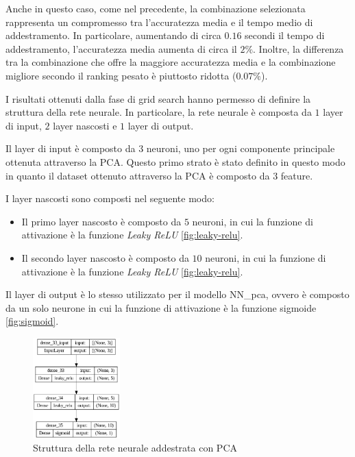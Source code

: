 Anche in questo caso, come nel precedente, la combinazione selezionata 
rappresenta un compromesso tra l'accuratezza media e il tempo medio di 
addestramento. In particolare, aumentando di circa $0.16$ secondi il tempo di 
addestramento, l'accuratezza media aumenta di circa il $2\%$. Inoltre, la 
differenza tra la combinazione che offre la maggiore accuratezza media e la 
combinazione migliore secondo il ranking pesato è piuttosto ridotta ($0.07\%$).

I risultati ottenuti dalla fase di grid search hanno permesso di definire la
struttura della rete neurale. In particolare, la rete neurale è composta da $1$
layer di input, $2$ layer nascosti e $1$ layer di output.

Il layer di input è composto da $3$ neuroni, uno per ogni componente principale
ottenuta attraverso la PCA. Questo primo strato è stato definito in questo modo
in quanto il dataset ottenuto attraverso la PCA è composto da $3$ feature.

I layer nascosti sono composti nel seguente modo:
\begin{itemize}
    \item Il primo layer nascosto è composto da $5$ neuroni, in cui la funzione di
          attivazione è la funzione \textit{Leaky ReLU} \ref{fig:leaky-relu}.
    \item Il secondo layer nascosto è composto da $10$ neuroni, in cui la funzione
          di attivazione è la funzione \textit{Leaky ReLU} \ref{fig:leaky-relu}.
\end{itemize}

Il layer di output è lo stesso utilizzato per il modello NN\_pca, ovvero è composto
da un solo neurone in cui la funzione di attivazione è la funzione sigmoide \ref{fig:sigmoid}.

\begin{figure}[!ht]
    \centering
    \includegraphics[width=0.3\textwidth]{img/rete/struttura_rete_pca.png}
    \caption{Struttura della rete neurale addestrata con PCA}
    \label{fig:strutturaReteNeuralePCA}
\end{figure}

